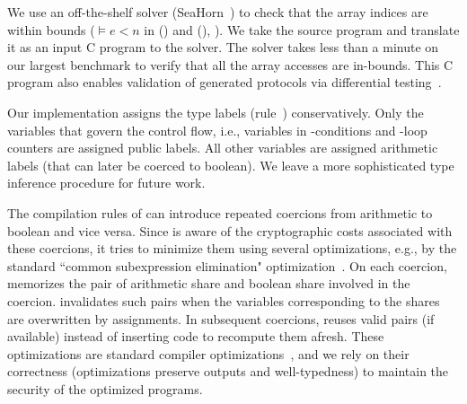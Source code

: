 We use an off-the-shelf solver
(SeaHorn~\cite{seahorn}) to check that the array indices
are within bounds ($\models e < n$
in ({}) and ({}),
). We take the \tool source program and
translate it as an input C program to the solver. The solver takes less
than a minute on our largest benchmark to verify that all the array
accesses are in-bounds. This C program also enables
validation of \tool generated protocols via differential testing~\cite{mckeeman,frigate}.

Our implementation assigns the type labels (rule~{})
conservatively. Only the variables that govern the control flow, i.e.,
variables in -conditions and -loop counters are
assigned public labels.
All other variables are assigned arithmetic labels (that can later be
coerced to boolean).
We leave a more sophisticated type inference procedure for future work.

The compilation rules of  can introduce
repeated coercions from arithmetic to
boolean and vice versa.
Since \tool is aware of the cryptographic costs associated with these coercions,
it tries to minimize them using several optimizations, e.g., by
the standard ``common subexpression elimination"
optimization~\cite{dragonbook}.
On each coercion, \tool memorizes the pair of arithmetic
share and boolean share involved in the coercion. 
\tool invalidates such pairs when the variables corresponding to the
shares are overwritten by assignments. 
In subsequent coercions, \tool  reuses valid pairs (if available)
instead of inserting code to recompute them afresh.
These optimizations are standard compiler
optimizations~\cite{dragonbook}, and we rely on their correctness
(optimizations preserve outputs and well-typedness) to
maintain the security of the optimized programs.

